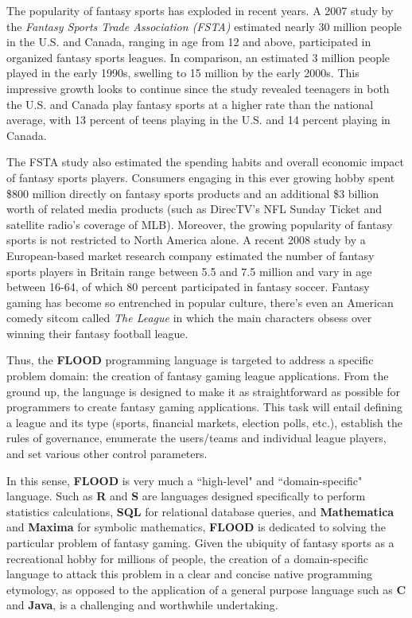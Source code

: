 \documentclass[12pt]{report}
\begin{document}
The popularity of fantasy sports has exploded in recent years. A 2007 study by the \textit{Fantasy Sports Trade Association (FSTA)} estimated  nearly 30 million people in the U.S. and Canada, ranging in age from 12 and above, participated in organized fantasy sports leagues. In comparison, an estimated 3 million people played in the early 1990s, swelling to 15 million by the early 2000s. This impressive growth looks to continue since the study revealed teenagers in both the U.S. and Canada play fantasy sports at a higher rate than the national average, with 13 percent of teens playing in the U.S. and 14 percent playing in Canada.

The FSTA study also estimated the spending habits and overall economic impact of fantasy sports players. Consumers engaging in this ever growing hobby spent \$800 million directly on fantasy sports products and an additional \$3 billion worth of related media products (such as DirecTV's NFL Sunday Ticket and satellite radio's coverage of MLB). Moreover, the growing popularity of fantasy sports is not restricted to North America alone. A recent 2008 study by a European-based market research company estimated the number of fantasy sports players in Britain range between 5.5 and 7.5 million and vary in age between 16-64, of which 80 percent participated in fantasy soccer. Fantasy gaming has become so entrenched in popular culture, there's even an American comedy sitcom called \textit{The League} in which the main characters obsess over winning their fantasy football league.

Thus, the \textbf{FLOOD} programming language is targeted to address a specific problem domain: the creation of fantasy gaming league applications. From the ground up, the language is designed to make it as straightforward as possible for programmers to create fantasy gaming applications. This task will entail defining a league and its type (sports, financial markets, election polls, etc.), establish the rules of governance, enumerate the users/teams and individual league players, and set various other control parameters. 

In this sense, \textbf{FLOOD} is very much a ``high-level" and ``domain-specific" language. Such as \textbf{R} and \textbf{S} are languages designed specifically to perform statistics calculations, \textbf{SQL} for relational database queries, and \textbf{Mathematica} and \textbf{Maxima} for symbolic mathematics, \textbf{FLOOD} is dedicated to solving the particular problem of fantasy gaming. Given the ubiquity of fantasy sports as a recreational hobby for millions of people, the creation of a domain-specific language to attack this problem in a clear and concise native programming etymology, as opposed to the application of a general purpose language such as \textbf{C} and \textbf{Java}, is a challenging and worthwhile undertaking.
\end{document}
